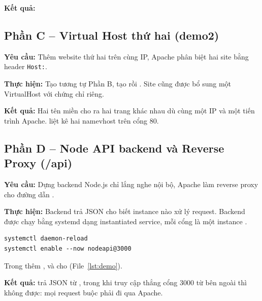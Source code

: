 \textbf{\large Kết quả:}

\subsection{Phần C -- Virtual Host thứ hai (demo2)}
\textbf{\large Yêu cầu:} Thêm website thứ hai trên cùng IP, Apache phân biệt
hai site bằng header \texttt{Host:}.

\textbf{\large Thực hiện:} Tạo  tương tự Phần B, tạo
 rồi . Site  cũng được bổ sung
một VirtualHost  với chứng chỉ riêng.


\textbf{\large Kết quả:} Hai tên miền cho ra hai trang khác nhau dù cùng một IP và
một tiến trình Apache.  liệt kê hai namevhost trên cổng 80.

\subsection{Phần D -- Node API backend và Reverse Proxy (/api)}
\textbf{\large Yêu cầu:} Dựng backend Node.js chỉ lắng nghe nội bộ, Apache làm
reverse proxy cho đường dẫn .

\textbf{\large Thực hiện:} Backend  trả JSON cho biết
instance nào xử lý request. Backend được chạy bằng systemd dạng instantiated
service, mỗi cổng là một instance .


\begin{verbatim}
systemctl daemon-reload
systemctl enable --now nodeapi@3000
\end{verbatim}
Trong  thêm ,  và
 cho  (File~\ref{lst:demo}).

\textbf{\large Kết quả:}  trả JSON từ , trong khi
truy cập thẳng cổng 3000 từ bên ngoài thì không được: mọi request buộc phải đi
qua Apache.

